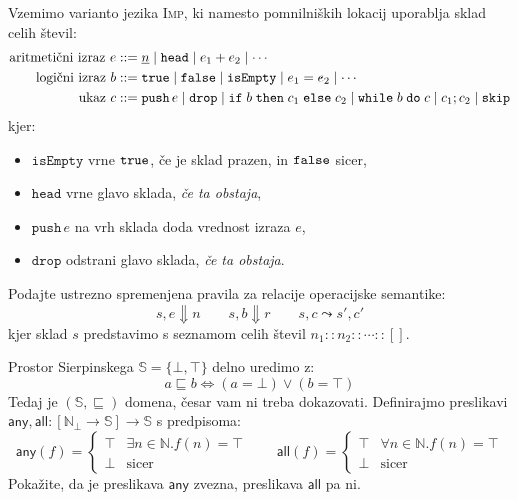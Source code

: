 \documentclass[arhiv]{../izpit}
\begin{document}
\nadaljevanje


\naloga[\tocke{20}]

Vzemimo varianto jezika \textsc{Imp}, ki namesto pomnilniških lokacij uporablja sklad celih števil:
%
\begin{align*}
  \text{aritmetični izraz } e &::=
    \underline{n} \mid
    \mathtt{head} \mid
    e_1 + e_2 \mid
    \cdots \\
  \text{logični izraz } b &::=
    \mathtt{true} \mid
    \mathtt{false} \mid
    \mathtt{isEmpty} \mid
    e_1 = e_2 \mid
    \cdots \\
  \text{ukaz } c &::=
    \mathtt{push}\, e \mid
    \mathtt{drop} \mid
    \mathtt{if}\;b\;\mathtt{then}\;c_1\;\mathtt{else}\;c_2 \mid
    \mathtt{while}\;b\;\mathtt{do}\;c \mid
    c_1 ; c_2 \mid
    \mathtt{skip}
\end{align*}
%
kjer:
\begin{itemize}
  \item $\mathtt{isEmpty}$ vrne $\mathtt{true}$, če je sklad prazen, in $\mathtt{false}$ sicer,
  \item $\mathtt{head}$ vrne glavo sklada, \emph{če ta obstaja},
  \item $\mathtt{push} \, e$ na vrh sklada doda vrednost izraza $e$,
  \item $\mathtt{drop}$ odstrani glavo sklada, \emph{če ta obstaja}.
\end{itemize}
%
Podajte ustrezno spremenjena pravila za relacije operacijske semantike:
\[
  s, e \Downarrow n \qquad s, b \Downarrow r \qquad s, c \leadsto s', c'
\]
kjer sklad $s$ predstavimo s seznamom celih števil  $n_1 :\!: n_2 :\!: \cdots :\!: []$.

\nadaljevanje


\naloga[\tocke{20}]

Prostor Sierpinskega $\mathbb{S} = \{ \bot, \top \}$ delno uredimo z:
\[
    a \sqsubseteq b \iff (a = \bot) \lor (b = \top)
\]
Tedaj je $(\mathbb{S}, \sqsubseteq)$ domena, česar vam ni treba dokazovati.
Definirajmo preslikavi $\mathsf{any}, \mathsf{all} : [\mathbb{N}_\bot \to \mathbb{S}] \to \mathbb{S}$ s predpisoma:
\[
  \mathsf{any}(f) = \begin{cases}
    \top & \exists n \in \mathbb{N}. f(n) = \top \\
    \bot & \text{sicer}
  \end{cases}
  \qquad
  \mathsf{all}(f) = \begin{cases}
    \top & \forall n \in \mathbb{N}. f(n) = \top \\
    \bot & \text{sicer}
  \end{cases}
\]
Pokažite, da je preslikava $\mathsf{any}$ zvezna, preslikava $\mathsf{all}$ pa ni.
\end{document}
